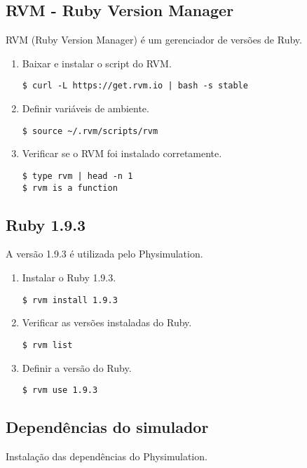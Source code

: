 \subsection{RVM - Ruby Version Manager}

RVM (Ruby Version Manager) é um gerenciador de versões de Ruby. 

\begin{enumerate}
\item Baixar e instalar o script do RVM.
\begin{verbatim}
$ curl -L https://get.rvm.io | bash -s stable
\end{verbatim}
\item Definir variáveis de ambiente.
\begin{verbatim}
$ source ~/.rvm/scripts/rvm
\end{verbatim}
\item Verificar se o RVM foi instalado corretamente.
\begin{verbatim}
$ type rvm | head -n 1
$ rvm is a function
\end{verbatim}
\end{enumerate}

\subsection{Ruby 1.9.3}

A versão 1.9.3 é utilizada pelo Physimulation.

\begin{enumerate}
\item Instalar o Ruby 1.9.3.
\begin{verbatim}
$ rvm install 1.9.3
\end{verbatim}
\item Verificar as versões instaladas do Ruby.
\begin{verbatim}
$ rvm list
\end{verbatim}
\item Definir a versão do Ruby.
\begin{verbatim}
$ rvm use 1.9.3
\end{verbatim}
\end{enumerate}

\subsection{Dependências do simulador}

Instalação das dependências do Physimulation.

